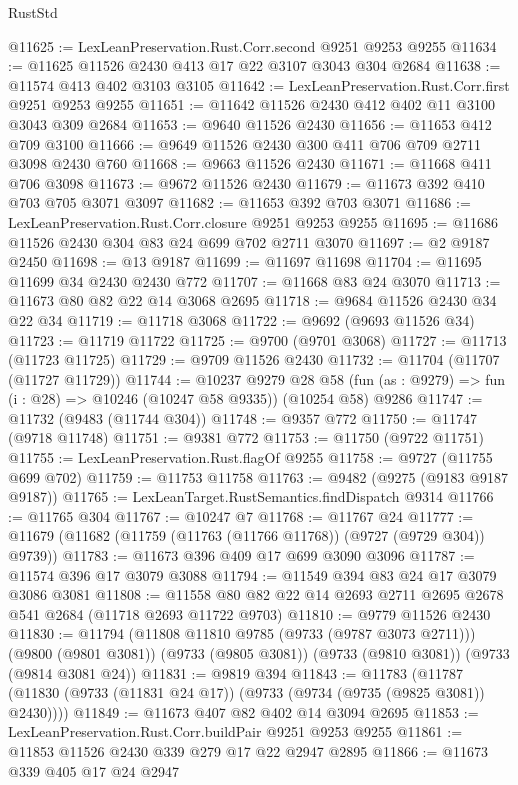 \begin{lexlean}{RustStd}
\begin{coremodule}
{\begin{coremodule}
{{{{{{{{{{{{{{{{{{{{{{{{{{{{{{{{{{{{{{{{{{{{{{{{{{{{{{{@11625 := LexLeanPreservation.Rust.Corr.second @9251 @9253 @9255
@11634 := @11625 @11526 @2430 @413 @17 @22 @3107 @3043 @304 @2684
@11638 := @11574 @413 @402 @3103 @3105
@11642 := LexLeanPreservation.Rust.Corr.first @9251 @9253 @9255
@11651 := @11642 @11526 @2430 @412 @402 @11 @3100 @3043 @309 @2684
@11653 := @9640 @11526 @2430
@11656 := @11653 @412 @709 @3100
@11666 := @9649 @11526 @2430 @300 @411 @706 @709 @2711 @3098 @2430 @760
@11668 := @9663 @11526 @2430
@11671 := @11668 @411 @706 @3098
@11673 := @9672 @11526 @2430
@11679 := @11673 @392 @410 @703 @705 @3071 @3097
@11682 := @11653 @392 @703 @3071
@11686 := LexLeanPreservation.Rust.Corr.closure @9251 @9253 @9255
@11695 := @11686 @11526 @2430 @304 @83 @24 @699 @702 @2711 @3070
@11697 := @2 @9187 @2450
@11698 := @13 @9187
@11699 := @11697 @11698
@11704 := @11695 @11699 @34 @2430 @2430 @772
@11707 := @11668 @83 @24 @3070
@11713 := @11673 @80 @82 @22 @14 @3068 @2695
@11718 := @9684 @11526 @2430 @34 @22 @34
@11719 := @11718 @3068
@11722 := @9692 (@9693 @11526 @34)
@11723 := @11719 @11722
@11725 := @9700 (@9701 @3068)
@11727 := @11713 (@11723 @11725)
@11729 := @9709 @11526 @2430
@11732 := @11704 (@11707 (@11727 @11729))
@11744 := @10237
    @9279
    @28
    @58
    (fun (as : @9279) => fun (i : @28) => @10246 (@10247 @58 @9335))
    (@10254 @58)
    @9286
@11747 := @11732 (@9483 (@11744 @304))
@11748 := @9357 @772
@11750 := @11747 (@9718 @11748)
@11751 := @9381 @772
@11753 := @11750 (@9722 @11751)
@11755 := LexLeanPreservation.Rust.flagOf @9255
@11758 := @9727 (@11755 @699 @702)
@11759 := @11753 @11758
@11763 := @9482 (@9275 (@9183 @9187 @9187))
@11765 := LexLeanTarget.RustSemantics.findDispatch @9314
@11766 := @11765 @304
@11767 := @10247 @7
@11768 := @11767 @24
@11777 := @11679 (@11682 (@11759 (@11763 (@11766 @11768)) (@9727 (@9729 @304)) @9739))
@11783 := @11673 @396 @409 @17 @699 @3090 @3096
@11787 := @11574 @396 @17 @3079 @3088
@11794 := @11549 @394 @83 @24 @17 @3079 @3086 @3081
@11808 := @11558 @80 @82 @22 @14 @2693 @2711 @2695 @2678 @541 @2684 (@11718 @2693 @11722 @9703)
@11810 := @9779 @11526 @2430
@11830 := @11794
    (@11808 @11810 @9785 (@9733 (@9787 @3073 @2711)))
    (@9800 (@9801 @3081))
    (@9733 (@9805 @3081))
    (@9733 (@9810 @3081))
    (@9733 (@9814 @3081 @24))
@11831 := @9819 @394
@11843 := @11783
    (@11787 (@11830 (@9733 (@11831 @24 @17)) (@9733 (@9734 (@9735 (@9825 @3081)) @2430))))
@11849 := @11673 @407 @82 @402 @14 @3094 @2695
@11853 := LexLeanPreservation.Rust.Corr.buildPair @9251 @9253 @9255
@11861 := @11853 @11526 @2430 @339 @279 @17 @22 @2947 @2895
@11866 := @11673 @339 @405 @17 @24 @2947
}}}}}}}}}}}}}}}}}}}}}}}}}}}}}}}}}}}}}}}}}}}}}}}}}}}}}}}
\end{coremodule}}
\end{coremodule}
\end{lexlean}
